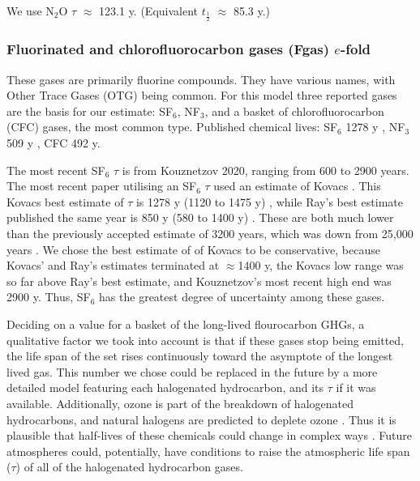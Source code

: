\documentclass{article}
\begin{document}
We use N$_2$O $\tau$ $\approx$ 123.1 y. (Equivalent $t_{\frac{1}{2}}$ $\approx$  85.3 y.) 

\subsubsection{Fluorinated and chlorofluorocarbon gases (Fgas) $e$-fold}
\label{Fgas_efold}
These gases are primarily fluorine compounds. They have various names, with Other Trace Gases (OTG) being common. For this model three reported gases are the basis for our estimate: SF$_6$, NF$_3$, and a basket of chlorofluorocarbon (CFC) gases, the most common type. Published chemical lives: SF$_6$ 1278 y \cite{Kovacs2017LifetimeOfSF6} , NF$_3$ 509 y \cite{Totterdill2016NF3andCFC115}, CFC 492 y\cite{Totterdill2016NF3andCFC115}. 

The most recent SF$_6$ $\tau$ is from Kouznetzov 2020, ranging from 600 to 2900 years. The most recent paper utilising an SF$_6$ $\tau$ used an estimate of Kovacs \cite[p. 1176]{Loeffel2022SF6impactOnAoA}. This Kovacs best estimate of $\tau$ is 1278 y (1120 to 1475 y) \cite{Kovacs2017LifetimeOfSF6}, while Ray's best estimate published the same year is 850 y (580 to 1400 y) \cite{Ray2107QuantificationSF6lifetime}. These are both much lower than the previously accepted estimate of 3200 years, which was down from 25,000 years \cite{Ko1993SF6SourcesSinks}. We chose the best estimate of of Kovacs to be conservative, because Kovacs' and Ray's estimates terminated at $\approx$1400 y, the Kovacs low range was so far above Ray's best estimate, and Kouznetzov's most recent high end was 2900 y. Thus, SF$_6$ has the greatest degree of uncertainty among these gases.

Deciding on a value for a basket of the long-lived flourocarbon GHGs, a qualitative factor we took into account is that if these gases stop being emitted, the life span of the set rises continuously toward the asymptote of the longest lived gas. This number we chose could be replaced in the future by a more detailed model featuring each halogenated hydrocarbon, and its $\tau$ if it was available. Additionally, ozone is part of the breakdown of halogenated hydrocarbons, and natural halogens are predicted to deplete ozone \cite{Anderson2018CouplingCatalysis,Anderson2017ChlorineBromineCatalysis}. Thus it is plausible that half-lives of these chemicals could change in complex ways \cite{Orkin2020AtmosLifeHalogenHydrocarbons}. Future atmospheres could, potentially, have conditions to raise the atmospheric life span ($\tau$) of all of the halogenated hydrocarbon gases. 
\end{document}

